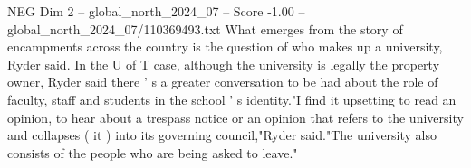 \begin{textsample}{NEG Dim 2 – global\_north\_2024\_07 – Score -1.00 – global\_north\_2024\_07/110369493.txt}
What emerges from the story of encampments across the country is the question of who makes up a university, Ryder said.
In the U of T case, although the university is legally the property owner, Ryder said there ' s a greater conversation to be had about the role of faculty, staff and students in the school ' s identity."I find it upsetting to read an opinion, to hear about a trespass notice or an opinion that refers to the university and collapses ( it ) into its governing council,"Ryder said."The university also consists of the people who are being asked to leave."

\end{textsample}
